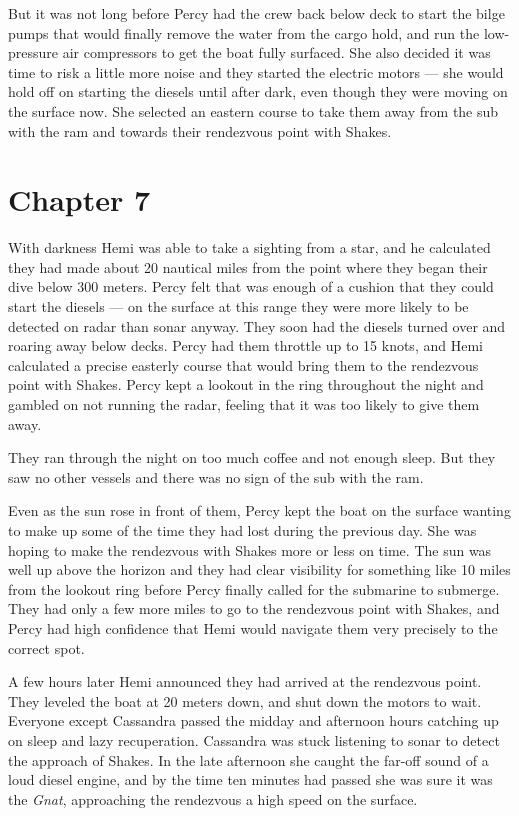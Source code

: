 \documentclass[]{scrbook}
\begin{document}
But it was not long before Percy had the crew back below deck to start
the bilge pumps that would finally remove the water from the cargo hold,
and run the low-pressure air compressors to get the boat fully surfaced.
She also decided it was time to risk a little more noise and they
started the electric motors --- she would hold off on starting the
diesels until after dark, even though they were moving on the surface
now. She selected an eastern course to take them away from the sub with
the ram and towards their rendezvous point with Shakes.

\hypertarget{chapter-7}{%
\chapter*{Chapter 7}\label{chapter-7}}

With darkness Hemi was able to take a sighting from a star, and he
calculated they had made about 20 nautical miles from the point where
they began their dive below 300 meters. Percy felt that was enough of a
cushion that they could start the diesels --- on the surface at this
range they were more likely to be detected on radar than sonar anyway.
They soon had the diesels turned over and roaring away below decks.
Percy had them throttle up to 15 knots, and Hemi calculated a precise
easterly course that would bring them to the rendezvous point with
Shakes. Percy kept a lookout in the ring throughout the night and
gambled on not running the radar, feeling that it was too likely to give
them away.

They ran through the night on too much coffee and not enough sleep. But
they saw no other vessels and there was no sign of the sub with the ram.

Even as the sun rose in front of them, Percy kept the boat on the
surface wanting to make up some of the time they had lost during the
previous day. She was hoping to make the rendezvous with Shakes more or
less on time. The sun was well up above the horizon and they had clear
visibility for something like 10 miles from the lookout ring before
Percy finally called for the submarine to submerge. They had only a few
more miles to go to the rendezvous point with Shakes, and Percy had high
confidence that Hemi would navigate them very precisely to the correct
spot.

A few hours later Hemi announced they had arrived at the rendezvous
point. They leveled the boat at 20 meters down, and shut down the motors
to wait. Everyone except Cassandra passed the midday and afternoon hours
catching up on sleep and lazy recuperation. Cassandra was stuck
listening to sonar to detect the approach of Shakes. In the late
afternoon she caught the far-off sound of a loud diesel engine, and by
the time ten minutes had passed she was sure it was the \emph{Gnat},
approaching the rendezvous a high speed on the surface.
\end{document}
